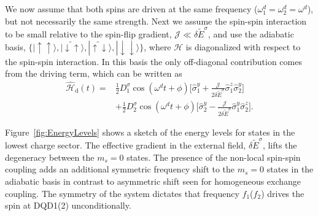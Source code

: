 \documentclass[%
 reprint,
 amsmath,amssymb,
 aps,
prl,
longbibliography
]{revtex4-1}
\begin{document}
We now assume that both spins are driven at the same frequency ($\omega^d_1=\omega^d_2=\omega^d$), but not necessarily the same strength. Next we assume the spin-spin interaction to be small relative to the spin-flip gradient, $\mathcal{J}\ll\delta\tilde{E}^\sigma$, and use the adiabatic basis, $\{ |\uparrow\uparrow\rangle,|\widetilde{\downarrow\uparrow}\rangle,|\widetilde{\uparrow\downarrow}\rangle,|\downarrow\downarrow\rangle\}$, where $\mathcal{H}$ is diagonalized with respect to the spin-spin interaction. In this basis the only off-diagonal contribution comes from the driving term, which can be written as
\begin{equation}
\begin{aligned}
   \hat{\mathcal{H}}_\text{d}(t)= &\frac{1}{2}D^\sigma_1\cos(\omega^d t+\phi)\bigg[\hat{\sigma}^y_1+\frac{\mathcal{J}}{2\delta\tilde{E}^\sigma}\hat{\sigma}^z_1\hat{\sigma}^y_2\bigg]\\
    &+\frac{1}{2}D^\sigma_2\cos(\omega^d t+\phi)\bigg[\hat{\sigma}^y_2 - \frac{\mathcal{J}}{2\delta\tilde{E}^\sigma}\hat{\sigma}^y_1\hat{\sigma}^z_2\bigg].
\end{aligned}
\label{eq:Hdriving}
\end{equation}

Figure~\ref{fig:EnergyLevels} shows a sketch of the energy levels for states in the lowest charge sector. The effective gradient in the external field, $\delta \tilde{E}^\sigma$, lifts the degeneracy between the $m_s=0$ states. The presence of the non-local spin-spin coupling adds an additional symmetric frequency shift to the $m_s=0$ states in the adiabatic basis in contrast to asymmetric shift seen for homogeneous exchange coupling\cite{Russ2018}. The symmetry of the system dictates that frequency $f_1$($f_2$) drives the spin at DQD1(2) unconditionally.
\end{document}
